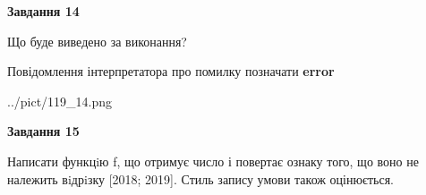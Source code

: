 \documentclass[11pt, ukrainian]{article}
\begin{document}
{\begin {large}
{\begin {center}\textbf{Завдання 14}\end {center}}\par
Що буде виведено за виконання? \par
Повідомлення інтерпретатора про помилку позначати \textbf{error}

\begin{center}
	{../pict/119_14.png}
\end{center}
\newpage

{\begin {center}\textbf{Завдання 15}\end {center}}\par

Написати функцiю f, що отримує число і повертає ознаку того, що воно не належить вiдрiзку [2018; 2019]. Стиль запису умови також оцінюється.\par
\newpage

\end {large}}
\end{document}
